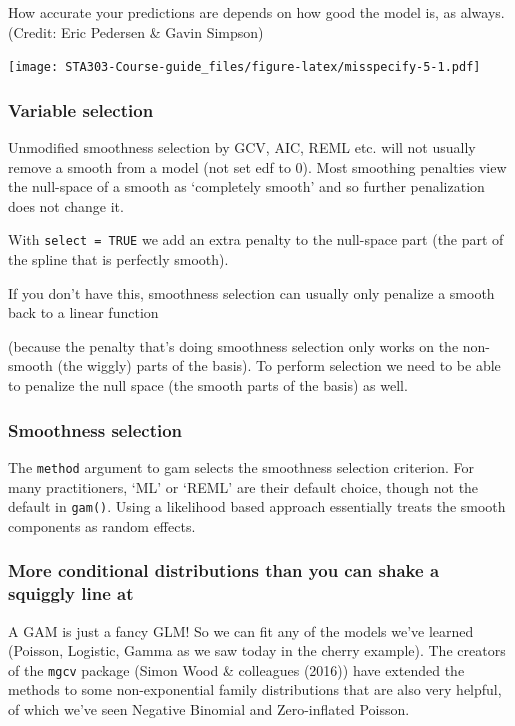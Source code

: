 \documentclass[
  openany]{book}
\begin{document}
How accurate your predictions are depends on how good the model is, as always. (Credit: Eric Pedersen \& Gavin Simpson)

\texttt{[image: STA303-Course-guide\_files/figure-latex/misspecify-5-1.pdf]}

\hypertarget{variable-selection}{%
\subsubsection{Variable selection}\label{variable-selection}}

Unmodified smoothness selection by GCV, AIC, REML etc. will not usually remove a smooth from a model (not set edf to 0). Most smoothing penalties view the null-space of a smooth as `completely smooth' and so further penalization does not change it.

With \texttt{select\ =\ TRUE} we add an extra penalty to the null-space part (the part of the spline that is perfectly smooth).

If you don't have this, smoothness selection can usually only penalize a smooth back to a linear function

(because the penalty that's doing smoothness selection only works on the non-smooth (the wiggly) parts of the basis). To perform selection we need to be able to penalize the null space (the smooth parts of the basis) as well.

\hypertarget{smoothness-selection}{%
\subsubsection{Smoothness selection}\label{smoothness-selection}}

The \texttt{method} argument to gam selects the smoothness selection criterion. For many practitioners, `ML' or `REML' are their default choice, though not the default in \texttt{gam()}. Using a likelihood based approach essentially treats the smooth components as random effects.

\hypertarget{more-conditional-distributions-than-you-can-shake-a-squiggly-line-at}{%
\subsubsection{More conditional distributions than you can shake a squiggly line at}\label{more-conditional-distributions-than-you-can-shake-a-squiggly-line-at}}

A GAM is just a fancy GLM! So we can fit any of the models we've learned (Poisson, Logistic, Gamma as we saw today in the cherry example). The creators of the \texttt{mgcv} package (Simon Wood \& colleagues (2016)) have extended the methods to some non-exponential family distributions that are also very helpful, of which we've seen Negative Binomial and Zero-inflated Poisson.
\end{document}
